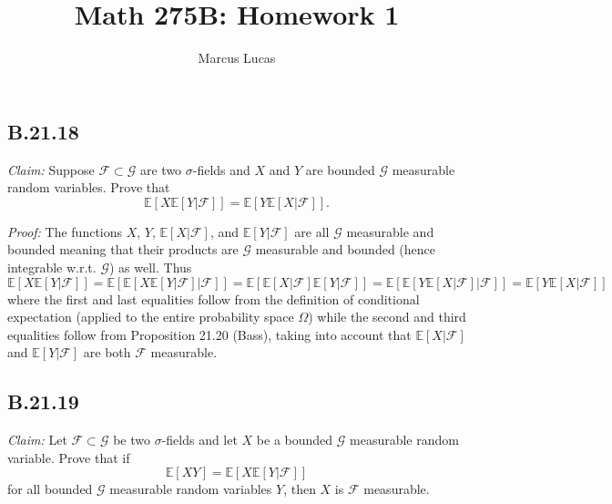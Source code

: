 \documentclass[10pt]{article}
\title{Math 275B: Homework 1}
\author{Marcus Lucas}
\date{\vspace{-1cm}}
\begin{document}
\maketitle

\subsection*{B.21.18}

\textit{Claim:} Suppose $\mathcal{F} \subset \mathcal{G}$ are two
$\sigma$-fields and $X$ and $Y$ are bounded $\mathcal{G}$
measurable random variables. Prove that
\begin{equation*}
  \mathbb{E}\left[X \mathbb{E} \left[Y \vert \mathcal{F} \right] \right]
  = \mathbb{E}\left[Y \mathbb{E} \left[X \vert \mathcal{F} \right] \right].
\end{equation*}

\textit{Proof:} The functions $X$, $Y$, 
$\mathbb{E} \left[X \vert \mathcal{F} \right]$, and 
$\mathbb{E} \left[Y \vert \mathcal{F} \right]$
are all $\mathcal{G}$ measurable and bounded
meaning that their products are $\mathcal{G}$ measurable
and bounded (hence integrable w.r.t. $\mathcal{G}$) as well. Thus
\begin{equation*}
  \mathbb{E}\left[X \mathbb{E} \left[Y \vert \mathcal{F} \right] \right]
  = \mathbb{E}\left[\mathbb{E} \left[ X \mathbb{E} 
    \left[Y \vert \mathcal{F} \right] \vert \mathcal{F} \right] \right]
  = \mathbb{E}\left[\mathbb{E} \left[ X \vert \mathcal{F} \right] 
    \mathbb{E} \left[Y \vert \mathcal{F} \right] \right]
    = \mathbb{E}\left[\mathbb{E} \left[ Y \mathbb{E} 
    \left[X \vert \mathcal{F} \right] \vert \mathcal{F} \right] \right]
  = \mathbb{E}\left[Y \mathbb{E} \left[X \vert \mathcal{F} \right] \right]
\end{equation*}
where the first and last equalities follow from the definition
of conditional expectation (applied to the entire probability space $\Omega$) 
while the second and third equalities follow from Proposition 21.20 (Bass),
taking into account that $\mathbb{E} \left[X \vert \mathcal{F} \right]$
and $\mathbb{E} \left[Y \vert \mathcal{F} \right]$ are both
$\mathcal{F}$ measurable.

\subsection*{B.21.19}

\textit{Claim:} Let $\mathcal{F} \subset \mathcal{G}$ be two
$\sigma$-fields and let $X$ be a bounded $\mathcal{G}$ measurable
random variable. Prove that if
\begin{equation*}
  \mathbb{E}\left[X Y \right]
  = \mathbb{E}\left[X \mathbb{E} \left[Y \vert \mathcal{F} \right] \right]
\end{equation*}
for all bounded $\mathcal{G}$ measurable random variables $Y$,
then $X$ is $\mathcal{F}$ measurable.
\end{document}

